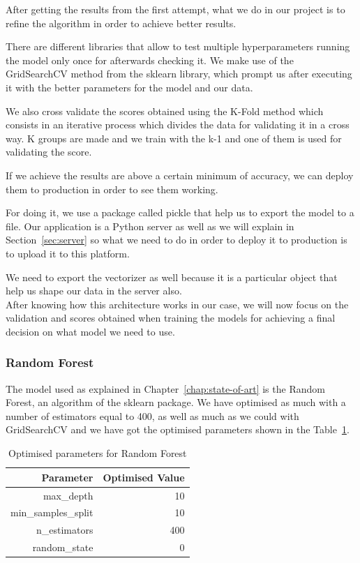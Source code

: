 After getting the results from the first attempt, what we do in our project is to refine the algorithm in order to achieve better results.

There are different libraries that allow to test multiple hyperparameters running the model only once for afterwards checking it. We make use of the GridSearchCV method from the sklearn library, which prompt us after executing it with the better parameters for the model and our data.

We also cross validate the scores obtained using the K-Fold method which consists in an iterative process which divides the data for validating it in a cross way. K groups are made and we train with the k-1 and one of them is used for validating the score. 

If we achieve the results are above a certain minimum of accuracy, we can deploy them to production in order to see them working. 

For doing it, we use a package called pickle that help us to export the model to a file. Our application is a Python server as well as we will explain in Section~\ref{sec:server} so what we need to do in order to deploy it to production is to upload it to this platform.

We need to export the vectorizer as well because it is a particular object that help  us shape our data in the server also.\\

After knowing how this architecture works in our case, we will now focus on the validation and scores obtained when training the models for achieving a final decision on what model we need to use.

\subsubsection{Random Forest}
The model used as explained in Chapter~\ref{chap:state-of-art} is the Random Forest, an algorithm of the sklearn package. We have optimised as much with a number of estimators equal to 400, as well as much as we could with GridSearchCV and we have got the optimised parameters shown in the Table~\ref{tab:RFoptimisedparams}.


\begin{table}[htp]
\centering
\begin{tabular}{|r|r|}
\hline
\textbf{Parameter}  & \textbf{Optimised Value} \\ \hline
max\_depth          & 10                       \\ \hline
min\_samples\_split & 10                       \\ \hline
n\_estimators       & 400                      \\ \hline
random\_state       & 0                        \\ \hline
\end{tabular}
\caption{Optimised parameters for Random Forest}
\label{tab:RFoptimisedparams}
\end{table}

